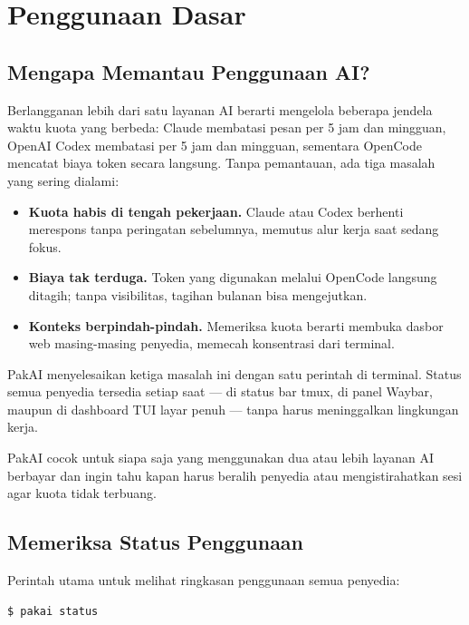 \chapter{Penggunaan Dasar}

\section{Mengapa Memantau Penggunaan AI?}

Berlangganan lebih dari satu layanan AI berarti mengelola beberapa jendela waktu
kuota yang berbeda: Claude membatasi pesan per 5 jam dan mingguan, OpenAI Codex
membatasi per 5 jam dan mingguan, sementara OpenCode mencatat biaya token secara
langsung. Tanpa pemantauan, ada tiga masalah yang sering dialami:

\begin{itemize}
  \item \textbf{Kuota habis di tengah pekerjaan.} Claude atau Codex berhenti
        merespons tanpa peringatan sebelumnya, memutus alur kerja saat sedang
        fokus.
  \item \textbf{Biaya tak terduga.} Token yang digunakan melalui OpenCode
        langsung ditagih; tanpa visibilitas, tagihan bulanan bisa mengejutkan.
  \item \textbf{Konteks berpindah-pindah.} Memeriksa kuota berarti membuka
        dasbor web masing-masing penyedia, memecah konsentrasi dari terminal.
\end{itemize}

PakAI menyelesaikan ketiga masalah ini dengan satu perintah di terminal. Status
semua penyedia tersedia setiap saat — di status bar tmux, di panel Waybar, maupun
di dashboard TUI layar penuh — tanpa harus meninggalkan lingkungan kerja.

\begin{tipbox}
  PakAI cocok untuk siapa saja yang menggunakan dua atau lebih layanan AI
  berbayar dan ingin tahu kapan harus beralih penyedia atau mengistirahatkan sesi
  agar kuota tidak terbuang.
\end{tipbox}

\section{Memeriksa Status Penggunaan}

Perintah utama untuk melihat ringkasan penggunaan semua penyedia:

\begin{lstlisting}[style=terminal]
$ pakai status
\end{lstlisting}


